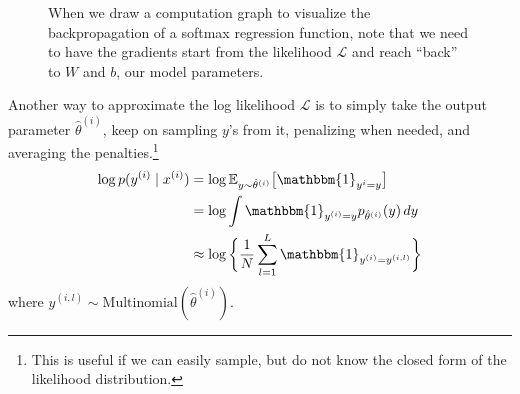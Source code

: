 \begin{example}[Softmax]
\begin{figure}[H]
      \caption{ When we draw a computation graph to visualize the backpropagation of a softmax regression function, note that we need to have the gradients start from the likelihood $\mathcal{L}$ and reach ``back'' to $W$ and $b$, our model parameters. }
      \label{fig:softmax1}
    \end{figure}

    Another way to approximate the log likelihood $\mathcal{L}$ is to simply take the output parameter $\hat{\theta}^{(i)}$, keep on sampling $y$'s from it, penalizing when needed, and averaging the penalties.\footnote{This is useful if we can easily sample, but do not know the closed form of the likelihood distribution.}
    \begin{align}
      \log p(y^{(i)} \mid x^{(i)}) & = \log \mathbb{E}_{y \sim \hat{\theta}^{(i)}} \big[ \mathbbm{1}_{y^{i} = y} \big] \\
                                   & = \log \int \mathbbm{1}_{y^{(i)} = y} p_{\hat{\theta}^{(i)}} (y) \,dy \\
                                   & \approx \log \bigg\{ \frac{1}{N} \sum_{l=1}^L \mathbbm{1}_{y^{(i)} = y^{(i, l)}} \bigg\}
    \end{align}
    where $y^{(i, l)} \sim \mathrm{Multinomial} (\hat{\theta}^{(i)})$. 


\end{example}
